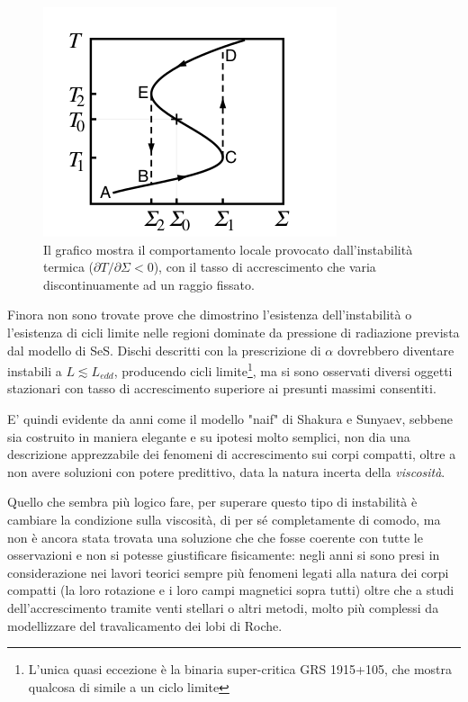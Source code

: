 \documentclass[a4paperbi]{article}
\begin{document}
	\begin{figure}[H]
		\centering
		\includegraphics[width=0.4\linewidth]{CicloLimite}
		\caption{Il grafico mostra il comportamento locale provocato dall'instabilità termica ($\partial T/\partial\Sigma<0$), con il tasso di accrescimento che varia discontinuamente ad un raggio fissato.}
		\label{fig:CicloLimite}
	\end{figure}
	
	Finora non sono trovate prove che dimostrino l'esistenza dell'instabilità o l'esistenza di cicli limite nelle regioni dominate da pressione di radiazione prevista dal modello di SeS. Dischi descritti con la prescrizione di $\alpha$ dovrebbero diventare instabili a $L\lesssim L_{edd}$, producendo cicli limite\footnote{L'unica quasi eccezione è la binaria super-critica GRS 1915+105, che mostra qualcosa di simile a un ciclo limite}, ma si sono osservati diversi oggetti stazionari con tasso di accrescimento superiore ai presunti massimi consentiti.
	
	E' quindi evidente da anni come il modello "naif" di Shakura e Sunyaev, sebbene sia costruito in maniera elegante e su ipotesi molto semplici, non dia una descrizione apprezzabile dei fenomeni di accrescimento sui corpi compatti, oltre a non avere soluzioni con potere predittivo, data la natura incerta della \textit{viscosità}.
	
	Quello che sembra più logico fare, per superare questo tipo di instabilità è cambiare la condizione sulla viscosità, di per sé completamente di comodo, ma non è ancora stata trovata una soluzione che che fosse coerente con tutte le osservazioni e non si potesse giustificare fisicamente: negli anni si sono presi in considerazione nei lavori teorici sempre più fenomeni legati alla natura dei corpi compatti (la loro rotazione e i loro campi magnetici sopra tutti) oltre che a studi dell'accrescimento tramite venti stellari o altri metodi, molto più complessi da modellizzare del travalicamento dei lobi di Roche.
	
\end{document}
